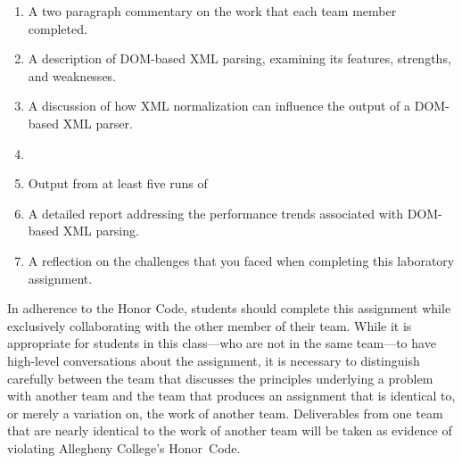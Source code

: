 \vspace*{-.05in}
\begin{enumerate}
  \setlength{\itemsep}{0pt}
  \item A two paragraph commentary on the work that each team member completed. 
  \item A description of DOM-based XML parsing, examining its features, strengths, and weaknesses.
  \item A discussion of how XML normalization can influence the output of a DOM-based XML parser.
  \item 
  \item Output from at least five runs of 
  \item A detailed report addressing the performance trends associated with DOM-based XML parsing.
  \item A reflection on the challenges that you faced when completing this laboratory assignment.
\end{enumerate}
\vspace*{-.05in}

In adherence to the Honor Code, students should complete this assignment while exclusively collaborating with the
other member of their team. While it is appropriate for students in this class---who are not in the same team---to have
high-level conversations about the assignment, it is necessary to distinguish carefully between the team that discusses
the principles underlying a problem with another team and the team that produces an assignment that is identical to, or
merely a variation on, the work of another team.  Deliverables from one team that are nearly identical to the work of
another team will be taken as evidence of violating Allegheny College's \mbox{Honor Code}.



